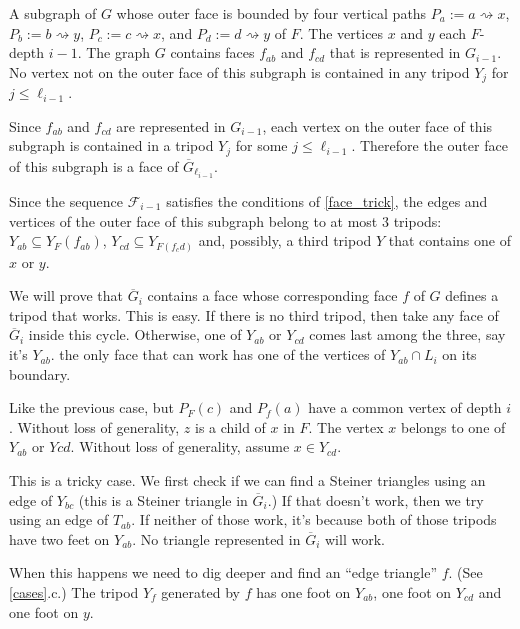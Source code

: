 \documentclass{patmorin}
\begin{document}
\begin{compactenum}[(a)]
  \item A subgraph of $G$ whose outer face is bounded by four vertical paths $P_a:=a\rightsquigarrow x$, $P_b:=b\rightsquigarrow y$, $P_c:=c\rightsquigarrow x$, and $P_d:=d\rightsquigarrow y$ of $F$.  The vertices $x$ and $y$ each $F$-depth $i-1$.  The graph $G$ contains faces $f_{ab}$ and $f_{cd}$ that is represented in $G_{i-1}$.  No vertex not on the outer face of this subgraph is contained in any tripod $Y_j$ for $j\le \ell_{i-1}$.

  Since $f_{ab}$ and $f_{cd}$ are represented in $G_{i-1}$, each vertex on the outer face of this subgraph is contained in a tripod $Y_{j}$ for some $j\le\ell_{i-1}$.  Therefore the outer face of this subgraph is a face of $\overline{G}_{\ell_{i-1}}$.

  Since the sequence $\mathcal{F}_{i-1}$ satisfies the conditions of \cref{face_trick}, the edges and vertices of the outer face of this subgraph belong to at most $3$ tripods:  $Y_{ab}\subseteq Y_F(f_{ab})$, $Y_{cd}\subseteq Y_{F(f_cd)}$ and, possibly, a third tripod $Y$ that contains one of $x$ or $y$.

  We will prove that $\overline{G}_{i}$ contains a face whose corresponding face $f$ of $G$ defines a tripod that works.  This is easy. If there is no third tripod, then take any face of $\overline{G}_{i}$ inside this cycle.  Otherwise, one of $Y_{ab}$ or $Y_{cd}$ comes last among the three, say it's $Y_{ab}$.  the only face that can work has one of the vertices of $Y_{ab}\cap L_{i}$ on its boundary.

  \item Like the previous case, but $P_F(c)$ and $P_f(a)$ have a common vertex of depth $i$.  Without loss of generality, $z$ is a child of $x$ in $F$.  The vertex $x$ belongs to one of $Y_{ab}$ or $Y{cd}$.  Without loss of generality, assume $x\in Y_{cd}$.

  This is a tricky case.  We first check if we can find a Steiner triangles using an edge of $Y_{bc}$ (this is a Steiner triangle in $\overline{G}_i$.) If that doesn't work, then we try using an edge of $T_{ab}$.  If neither of those work, it's because both of those tripods have two feet on $Y_{ab}$.  No triangle represented in $\overline{G}_i$ will work.

  When this happens we need to dig deeper and find an ``edge triangle'' $f$.  (See \cref{cases}.c.)  The tripod $Y_f$ generated by $f$ has one foot on $Y_{ab}$, one foot on $Y_{cd}$ and one foot on $y$.


\end{compactenum}
\end{document}
